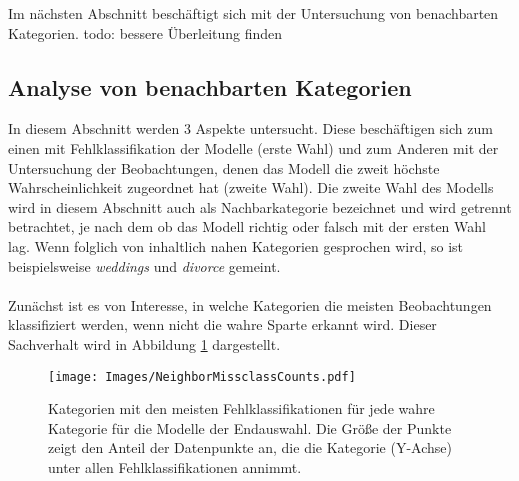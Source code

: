 \documentclass[a4paper,11pt]{article}
\begin{document}
Im nächsten Abschnitt beschäftigt sich mit der Untersuchung von benachbarten Kategorien. todo: bessere Überleitung finden

\subsection{Analyse von benachbarten Kategorien}

In diesem Abschnitt werden $3$ Aspekte untersucht. Diese beschäftigen sich zum einen mit Fehlklassifikation der Modelle (erste Wahl) und zum Anderen mit der Untersuchung der Beobachtungen, denen das Modell die zweit höchste Wahrscheinlichkeit zugeordnet hat (zweite Wahl). Die zweite Wahl des Modells wird in diesem Abschnitt auch als Nachbarkategorie bezeichnet und wird getrennt betrachtet, je nach dem ob das Modell richtig oder falsch mit der ersten Wahl lag. Wenn folglich von inhaltlich nahen Kategorien gesprochen wird, so ist beispielsweise \textit{weddings} und \textit{divorce} gemeint.\\
\\
Zunächst ist es von Interesse, in welche Kategorien die meisten Beobachtungen klassifiziert werden, wenn nicht die wahre Sparte erkannt wird. Dieser Sachverhalt wird in Abbildung \ref{abb:NeighborMissclassCounts} dargestellt.

\begin{figure}[ht]
    \centering
\texttt{[image: Images/NeighborMissclassCounts.pdf]} 
\caption{Kategorien mit den meisten Fehlklassifikationen für jede wahre Kategorie für die Modelle der Endauswahl. Die Größe der Punkte zeigt den Anteil der Datenpunkte an, die die Kategorie (Y-Achse) unter allen Fehlklassifikationen annimmt.}
\label{abb:NeighborMissclassCounts}
\end{figure}
\end{document}
